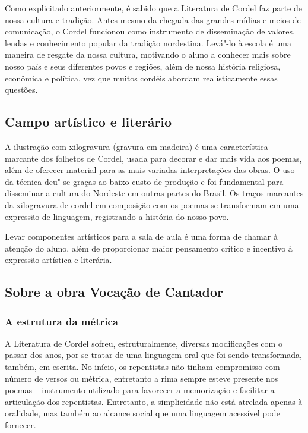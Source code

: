 \documentclass[12pt]{extarticle}
\begin{document}
{Como explicitado anteriormente, é sabido que a Literatura de Cordel faz
parte de nossa cultura e tradição. Antes mesmo da chegada das grandes
mídias e meios de comunicação, o Cordel funcionou como instrumento de
disseminação de valores, lendas e conhecimento popular da tradição
nordestina. Levá"-lo à escola é uma maneira de resgate da nossa cultura,
motivando o aluno a conhecer mais sobre nosso país e seus diferentes
povos e regiões, além de nossa história religiosa, econômica e política,
vez que muitos cordéis abordam realisticamente essas questões.

\subsection{Campo artístico e literário }

A ilustração com xilogravura (gravura em madeira) é uma característica
marcante dos folhetos de Cordel, usada para decorar e dar mais vida aos
poemas, além de oferecer material para as mais variadas interpretações
das obras. O uso da técnica deu"-se graças ao baixo custo de produção e
foi fundamental para disseminar a cultura do Nordeste em outras partes
do Brasil. Os traços marcantes da xilogravura de cordel em composição
com os poemas se transformam em uma expressão de linguagem, registrando
a história do nosso povo.

Levar componentes artísticos para a sala de aula é uma forma de chamar à
atenção do aluno, além de proporcionar maior pensamento crítico e
incentivo à expressão artística e literária.

\subsection{Sobre a obra Vocação de Cantador}

\subsubsection{A estrutura da métrica}

A Literatura de Cordel sofreu, estruturalmente, diversas modificações
com o passar dos anos, por se tratar de uma linguagem oral que foi sendo
transformada, também, em escrita. No início, os repentistas não tinham
compromisso com número de versos ou métrica, entretanto a rima sempre
esteve presente nos poemas -- instrumento utilizado para favorecer a
memorização e facilitar a articulação dos repentistas. Entretanto, a
simplicidade não está atrelada apenas à oralidade, mas também ao alcance
social que uma linguagem acessível pode fornecer.

}
\end{document}
